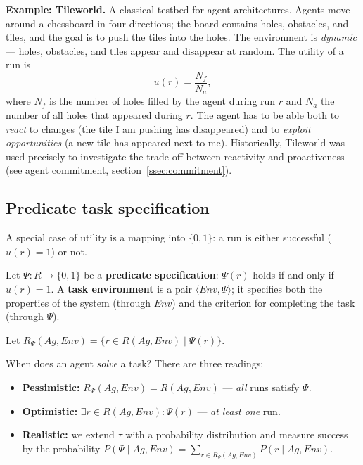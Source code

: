 \documentclass[11pt,a4paper]{article}
\theoremstyle{definition}
\begin{document}
\medskip
\noindent\textbf{Example: Tileworld.} A classical testbed for agent architectures. Agents move
around a chessboard in four directions; the board contains holes, obstacles, and tiles, and the
goal is to push the tiles into the holes. The environment is \emph{dynamic} --- holes, obstacles,
and tiles appear and disappear at random. The utility of a run is
\[
u(r) = \frac{N_f}{N_a},
\]
where $N_f$ is the number of holes filled by the agent during run $r$ and $N_a$ the number of all
holes that appeared during $r$. The agent has to be able both to \emph{react} to changes (the tile
I am pushing has disappeared) and to \emph{exploit opportunities} (a new tile has appeared next to
me). Historically, Tileworld was used precisely to investigate the trade-off between reactivity and
proactiveness (see agent commitment, section~\ref{ssec:commitment}).

\subsection{Predicate task specification}

A special case of utility is a mapping into $\{0,1\}$: a run is either successful ($u(r)=1$) or
not.

\begin{defbox}
Let $\Psi : R \to \{0,1\}$ be a \textbf{predicate specification}: $\Psi(r)$ holds if and only if
$u(r) = 1$. A \textbf{task environment} is a pair $\langle \mathit{Env}, \Psi \rangle$; it
specifies both the properties of the system (through $\mathit{Env}$) and the criterion for
completing the task (through $\Psi$).

Let $R_\Psi(Ag,\mathit{Env}) = \{ r \in R(Ag,\mathit{Env}) \mid \Psi(r) \}$.
\end{defbox}

When does an agent \emph{solve} a task? There are three readings:
\begin{itemize}
\item \textbf{Pessimistic:} $R_\Psi(Ag,\mathit{Env}) = R(Ag,\mathit{Env})$ --- \emph{all} runs
  satisfy $\Psi$.
\item \textbf{Optimistic:} $\exists r \in R(Ag,\mathit{Env}): \Psi(r)$ --- \emph{at least one} run.
\item \textbf{Realistic:} we extend $\tau$ with a probability distribution and measure success by
  the probability
  $P(\Psi \mid Ag,\mathit{Env}) = \sum_{r \in R_\Psi(Ag,\mathit{Env})} P(r \mid Ag,\mathit{Env})$.
\end{itemize}
\end{document}
